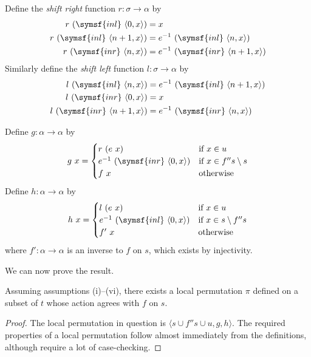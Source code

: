 \begin{definition}
    Define the \emph{shift right} function \( r : \sigma \to \alpha \) by
    \begin{align*}
        r\ (\symsf{inl}\ \langle 0, x \rangle) &= x \\
        r\ (\symsf{inl}\ \langle n + 1, x \rangle) &= e^{-1}\ (\symsf{inl}\ \langle n, x \rangle) \\
        r\ (\symsf{inr}\ \langle n, x \rangle) &= e^{-1}\ (\symsf{inr}\ \langle n + 1, x \rangle)
    \end{align*}
    Similarly define the \emph{shift left} function \( l : \sigma \to \alpha \) by
    \begin{align*}
        l\ (\symsf{inl}\ \langle n, x \rangle) &= e^{-1}\ (\symsf{inl}\ \langle n + 1, x \rangle) \\
        l\ (\symsf{inr}\ \langle 0, x \rangle) &= x \\
        l\ (\symsf{inr}\ \langle n + 1, x \rangle) &= e^{-1}\ (\symsf{inr}\ \langle n, x \rangle)
    \end{align*}
\end{definition}
\begin{definition}
    Define \( g : \alpha \to \alpha \) by
    \[ g\ x = \begin{cases}
        r\ (e\ x) & \text{if } x \in u \\
        e^{-1}\ (\symsf{inr}\ \langle 0, x \rangle) & \text{if } x \in f '' s \setminus s \\
        f\ x & \text{otherwise}
    \end{cases} \]
    Define \( h : \alpha \to \alpha \) by
    \[ h\ x = \begin{cases}
        l\ (e\ x) & \text{if } x \in u \\
        e^{-1}\ (\symsf{inl}\ \langle 0, x \rangle) & \text{if } x \in s \setminus f '' s \\
        f'\ x & \text{otherwise}
    \end{cases} \]
    where \( f' : \alpha \to \alpha \) is an inverse to \( f \) on \( s \), which exists by injectivity.
\end{definition}
We can now prove the result.
\begin{lemma}
    Assuming assumptions (i)--(vi), there exists a local permutation \( \pi \) defined on a subset of \( t \) whose action agrees with \( f \) on \( s \).
\end{lemma}
\begin{proof}
    The local permutation in question is \( \langle s \cup f '' s \cup u, g, h \rangle \).
    The required properties of a local permutation follow almost immediately from the definitions, although require a lot of case-checking.
\end{proof}
